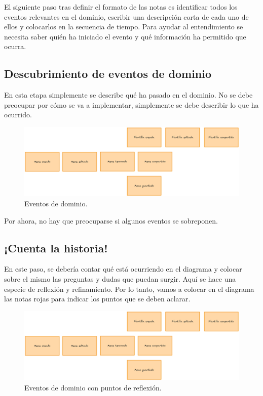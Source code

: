 El siguiente paso tras definir el formato de las notas es identificar todos los eventos relevantes en el dominio, escribir una descripción corta de cada uno de ellos y colocarlos en la secuencia de tiempo. Para ayudar al entendimiento se necesita saber quién ha iniciado el evento y qué información ha permitido que ocurra.

\subsection{Descubrimiento de eventos de dominio}

En esta etapa simplemente se describe qué ha pasado en el dominio. No se debe preocupar por cómo se va a implementar, simplemente se debe describir lo que ha ocurrido.

\begin{figure}[ht]
    \caption{Eventos de dominio.}
    \centering
    \vspace*{0.5cm}
    \includegraphics[scale=0.15]{figuras/eventosdominio.png}
\end{figure}

Por ahora, no hay que preocuparse si algunos eventos se sobreponen.

\subsection{¡Cuenta la historia!}

En este paso, se debería contar qué está ocurriendo en el diagrama y colocar sobre el mismo las preguntas y dudas que puedan surgir. Aquí se hace una especie de reflexión y refinamiento. Por lo tanto, vamos a colocar en el diagrama las notas rojas para indicar los puntos que se deben aclarar.

\begin{figure}[ht]
    \caption{Eventos de dominio con puntos de reflexión.}
    \centering
    \vspace*{0.5cm}
    \includegraphics[scale=0.15]{figuras/eventosdominio.png}
\end{figure}

